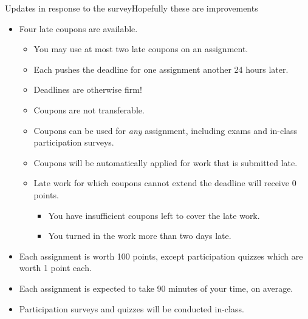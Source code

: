 \begin{frame}{Updates in response to the survey}{Hopefully these are improvements}

\begin{itemize}
    \item Four late coupons are available.
    \begin{itemize}
    \item You may use at most two late coupons on an assignment.        
    \item Each pushes the deadline for one assignment another 24 hours later.
        \item Deadlines are otherwise firm!
        \item Coupons are not transferable.
    \item Coupons can be used for \emph{any} assignment, including exams and in-class participation surveys.
    \item Coupons will be automatically applied for work that is submitted late.
    \item Late work for which coupons cannot extend the deadline will receive 0 points.
    \begin{itemize}
        \item You have insufficient coupons left to cover the late work.
        \item You turned in the work more than two days late.
    \end{itemize}
    \end{itemize}
    \item Each assignment is worth 100 points, except participation quizzes which are worth 1 point each.
    \item Each assignment is expected to take 90 minutes of your time, on average.
    \item Participation surveys and quizzes will be conducted in-class.
\end{itemize}
    
\end{frame}

